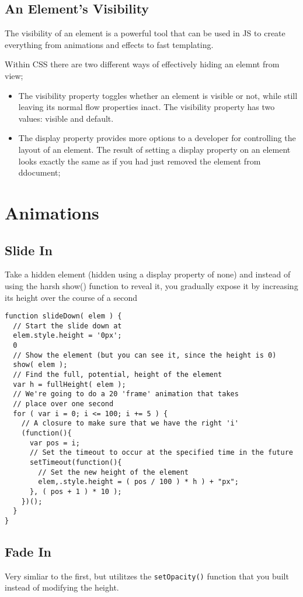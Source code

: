 \documentclass[a4paper,11pt]{book}
\begin{document}
\subsection{An Element's Visibility}
The visibility of an element is a powerful tool that can be used in JS to create
everything from animations and effects to fast templating.

Within CSS there are two different ways of effectively hiding an elemnt from
view;
\begin{itemize}
\item The visibility property toggles whether an element is visible or not,
while still leaving its normal flow properties inact. The visibility property
  has two values: visible and default.
\item The display property provides more options to a developer for controlling
the layout of an element. The result of setting a display property on an element
looks exactly the same as if you had just removed the element from ddocument; 
\end{itemize}
\section{Animations}
\subsection{Slide In}
Take a hidden element (hidden using a display property of none) and instead of
using the harsh show() function to reveal it, you gradually expose it by
increasing its height over the course of a second
\begin{verbatim}
function slideDown( elem ) {
  // Start the slide down at
  elem.style.height = '0px';
  0
  // Show the element (but you can see it, since the height is 0)
  show( elem );
  // Find the full, potential, height of the element
  var h = fullHeight( elem );
  // We're going to do a 20 'frame' animation that takes
  // place over one second
  for ( var i = 0; i <= 100; i += 5 ) {
    // A closure to make sure that we have the right 'i'
    (function(){
      var pos = i;
      // Set the timeout to occur at the specified time in the future
      setTimeout(function(){
        // Set the new height of the element
        elem,.style.height = ( pos / 100 ) * h ) + "px";
      }, ( pos + 1 ) * 10 );
    })();
  }
}
\end{verbatim}
\subsection{Fade In}
Very simliar to the first, but utilitzes the \verb|setOpacity()| function that you built instead of modifying the height.
\end{document}
